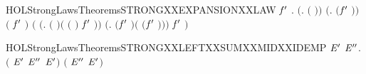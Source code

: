 \begin{SaveVerbatim}{HOLStrongLawsTheoremsSTRONGXXEXPANSIONXXLAW}
\HOLTokenTurnstile{} \HOLSymConst{\HOLTokenForall{}}  \ensuremath{\HOLBoundVar{f}\sp{\prime{}}} .
     \ensuremath{(}\HOLSymConst{\HOLTokenForall{}}.  \HOLSymConst{\HOLTokenLeq{}}  \HOLSymConst{\HOLTokenImp{}}  \ensuremath{(} \ensuremath{)}\ensuremath{)} \HOLSymConst{\HOLTokenConj{}}
     \ensuremath{(}\HOLSymConst{\HOLTokenForall{}}.  \HOLSymConst{\HOLTokenLeq{}}  \HOLSymConst{\HOLTokenImp{}}  \ensuremath{(}\ensuremath{\HOLBoundVar{f}\sp{\prime{}}} \ensuremath{)}\ensuremath{)} \HOLSymConst{\HOLTokenImp{}}
      \ensuremath{(}\HOLConst{\HOLTokenSum{}}   \HOLSymConst{\ensuremath{\mid}} \HOLConst{\HOLTokenSum{}} \ensuremath{\HOLBoundVar{f}\sp{\prime{}}} \ensuremath{)}
       \ensuremath{(}\HOLConst{\HOLTokenSum{}} \ensuremath{(}\HOLTokenLambda{}.  \ensuremath{(} \ensuremath{)}\HOLSymConst{\ensuremath{\ldotp}}\ensuremath{(} \ensuremath{(} \ensuremath{)} \HOLSymConst{\ensuremath{\mid}} \HOLConst{\HOLTokenSum{}} \ensuremath{\HOLBoundVar{f}\sp{\prime{}}} \ensuremath{)}\ensuremath{)}  \HOLSymConst{\ensuremath{+}}
        \HOLConst{\HOLTokenSum{}} \ensuremath{(}\HOLTokenLambda{}.  \ensuremath{(}\ensuremath{\HOLBoundVar{f}\sp{\prime{}}} \ensuremath{)}\HOLSymConst{\ensuremath{\ldotp}}\ensuremath{(}\HOLConst{\HOLTokenSum{}}   \HOLSymConst{\ensuremath{\mid}}  \ensuremath{(}\ensuremath{\HOLBoundVar{f}\sp{\prime{}}} \ensuremath{)}\ensuremath{)}\ensuremath{)}  \HOLSymConst{\ensuremath{+}}
           \ensuremath{\HOLBoundVar{f}\sp{\prime{}}} \ensuremath{)}
\end{SaveVerbatim}
\newcommand{\HOLStrongLawsTheoremsSTRONGXXEXPANSIONXXLAW}{\UseVerbatim{HOLStrongLawsTheoremsSTRONGXXEXPANSIONXXLAW}}
\begin{SaveVerbatim}{HOLStrongLawsTheoremsSTRONGXXLEFTXXSUMXXMIDXXIDEMP}
\HOLTokenTurnstile{} \HOLSymConst{\HOLTokenForall{}} \ensuremath{\HOLBoundVar{E}\sp{\prime{}}} \ensuremath{\HOLBoundVar{E}\sp{\prime{}\prime{}}}.  \ensuremath{(} \HOLSymConst{\ensuremath{+}} \ensuremath{\HOLBoundVar{E}\sp{\prime{}}} \HOLSymConst{\ensuremath{+}} \ensuremath{\HOLBoundVar{E}\sp{\prime{}\prime{}}} \HOLSymConst{\ensuremath{+}} \ensuremath{\HOLBoundVar{E}\sp{\prime{}}}\ensuremath{)} \ensuremath{(} \HOLSymConst{\ensuremath{+}} \ensuremath{\HOLBoundVar{E}\sp{\prime{}\prime{}}} \HOLSymConst{\ensuremath{+}} \ensuremath{\HOLBoundVar{E}\sp{\prime{}}}\ensuremath{)}
\end{SaveVerbatim}
